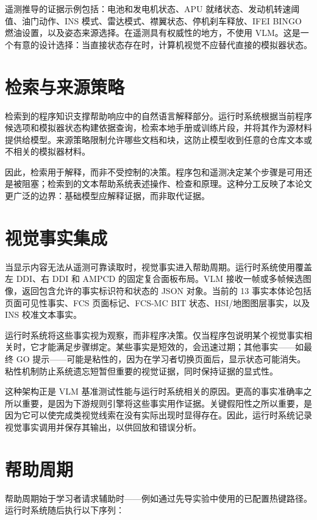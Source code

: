 遥测推导的证据示例包括：电池和发电机状态、APU 就绪状态、发动机转速阈值、油门动作、INS 模式、雷达模式、襟翼状态、停机刹车释放、IFEI BINGO 燃油设置，以及姿态来源选择。在遥测具有权威性的地方，不使用 VLM。这是一个有意的设计选择：当直接状态存在时，计算机视觉不应替代直接的模拟器状态。

\section{检索与来源策略}\label{sec:design-retrieval}

检索到的程序知识支撑帮助响应中的自然语言解释部分。运行时系统根据当前程序候选项和模拟器状态构建依据查询，检索本地手册或训练片段，并将其作为源材料提供给模型。来源策略限制允许哪些文档和块，这防止模型收到任意的仓库文本或不相关的模拟器材料。

因此，检索用于解释，而非不受控制的决策。程序包和遥测决定某个步骤是可用还是被阻塞；检索到的文本帮助系统表述操作、检查和原理。这种分工反映了本论文更广泛的边界：基础模型应解释证据，而非取代证据。

\section{视觉事实集成}\label{sec:design-vision}

当显示内容无法从遥测可靠读取时，视觉事实进入帮助周期。运行时系统使用覆盖左 DDI、右 DDI 和 AMPCD 的固定复合面板布局。VLM 接收一帧或多帧候选图像，返回包含允许的事实标识符和状态的 JSON 对象。当前的 13 事实本体论包括页面可见性事实、FCS 页面标记、FCS-MC BIT 状态、HSI/地图图层事实，以及 INS 校准文本事实。

运行时系统将这些事实视为观察，而非程序决策。仅当程序包说明某个视觉事实相关时，它才能满足步骤绑定。某些事实是短效的，会迅速过期；其他事实——如最终 GO 提示——可能是粘性的，因为在学习者切换页面后，显示状态可能消失。粘性机制防止系统遗忘短暂但重要的视觉证据，同时保持证据的显式性。

这种架构正是 VLM 基准测试性能与运行时系统相关的原因。更高的事实准确率之所以重要，是因为下游规则引擎将这些事实用作证据。关键假阳性之所以重要，是因为它可以使完成类视觉线索在没有实际出现时显得存在。因此，运行时系统记录视觉事实调用并保存其输出，以供回放和错误分析。

\section{帮助周期}\label{sec:design-help-cycle}

帮助周期始于学习者请求辅助时——例如通过先导实验中使用的已配置热键路径。运行时系统随后执行以下序列：

